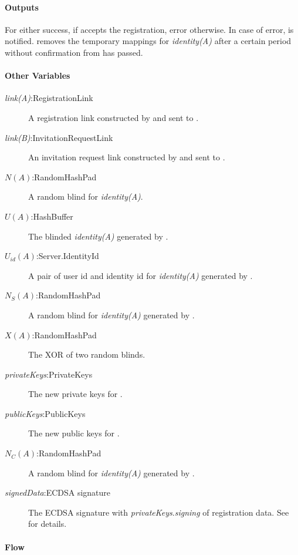 \documentclass[a4paper,10pt]{article}
\newcommand{\signedData}{\emph{signedData}}
\newcommand{\privateKeys}{\emph{privateKeys}}
\newcommand{\publicKeys}{\emph{publicKeys}}
\newcommand{\signingKey}{\privateKeys{}.\emph{signing}}
\newcommand{\identity}[1]{{\em identity(#1)}}
\newcommand{\link}[1]{{\em link(#1)}}
\begin{document}
\paragraph{Outputs}
For \Client[A] either success, if \Server{} accepts the registration, error otherwise. In case of error, \User[A] is notified. \Client[B] removes the temporary mappings for 
\identity{A} after a certain period without confirmation from \Server{} has passed.

\paragraph{Other Variables}
\SpecialItem
\begin{description}
 \item[\link{A}:RegistrationLink] A registration link constructed by \Client[B] and sent to \User[A].
 \item[\link{B}:InvitationRequestLink] An invitation request link constructed by \Client[A] and sent to \User[B].
 \item[$N(A)$:RandomHashPad] A random blind for \identity{A}.
 \item[$U(A)$:HashBuffer] The blinded \identity{A} generated by \Client[B].
 \item[$U_{id}(A)$:Server.IdentityId] A pair of user id and identity id for \identity{A} generated by \Server{}.
 \item[$N_S(A)$:RandomHashPad] A random blind for \identity{A} generated by \Server{}.
 \item[$X(A)$:RandomHashPad] The XOR of two random blinds.
 \item[\privateKeys{}:PrivateKeys] The new private keys for \Client[A].
 \item[\publicKeys{}:PublicKeys] The new public keys for \Client[B].
 \item[$N_C(A)$:RandomHashPad] A random blind for \identity{A} generated by \Client[A].
 \item[\signedData{}:ECDSA signature] The ECDSA signature with \signingKey{} of \Client[A] registration data. See \cite{crypto_spec} for details.
\end{description}

\paragraph{Flow}
\end{document}
